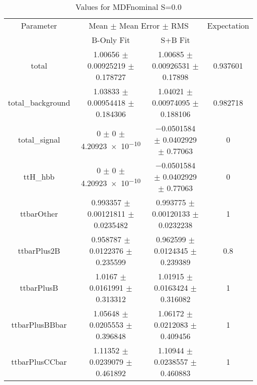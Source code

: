 \begin{table}
\centering
\caption{Values for MDFnominal S=0.0}
\begin{tabular}{cccc}
\toprule
Parameter & \multicolumn{2}{c}{Mean $\pm$ Mean Error $\pm$ RMS} & Expectation\\
 & B-Only Fit & S+B Fit & \\
\midrule
total & \num{1.00656} $\pm$ \num{0.00925219} $\pm$ \num{0.178727} & \num{1.00685} $\pm$ \num{0.00926531} $\pm$ \num{0.17898} & \num{0.937601}\\
total\_background & \num{1.03833} $\pm$ \num{0.00954418} $\pm$ \num{0.184306} & \num{1.04021} $\pm$ \num{0.00974095} $\pm$ \num{0.188106} & \num{0.982718}\\
total\_signal & \num{0} $\pm$ \num{0} $\pm$ \num{4.20923e-10} & \num{-0.0501584} $\pm$ \num{0.0402929} $\pm$ \num{0.77063} & \num{0}\\
ttH\_hbb & \num{0} $\pm$ \num{0} $\pm$ \num{4.20923e-10} & \num{-0.0501584} $\pm$ \num{0.0402929} $\pm$ \num{0.77063} & \num{0}\\
ttbarOther & \num{0.993357} $\pm$ \num{0.00121811} $\pm$ \num{0.0235482} & \num{0.993775} $\pm$ \num{0.00120133} $\pm$ \num{0.0232238} & \num{1}\\
ttbarPlus2B & \num{0.958787} $\pm$ \num{0.0122376} $\pm$ \num{0.235599} & \num{0.962599} $\pm$ \num{0.0124345} $\pm$ \num{0.239389} & \num{0.8}\\
ttbarPlusB & \num{1.0167} $\pm$ \num{0.0161991} $\pm$ \num{0.313312} & \num{1.01915} $\pm$ \num{0.0163424} $\pm$ \num{0.316082} & \num{1}\\
ttbarPlusBBbar & \num{1.05648} $\pm$ \num{0.0205553} $\pm$ \num{0.396848} & \num{1.06172} $\pm$ \num{0.0212083} $\pm$ \num{0.409456} & \num{1}\\
ttbarPlusCCbar & \num{1.11352} $\pm$ \num{0.0239079} $\pm$ \num{0.461892} & \num{1.10944} $\pm$ \num{0.0238557} $\pm$ \num{0.460883} & \num{1}\\
\bottomrule
\end{tabular}
\end{table}